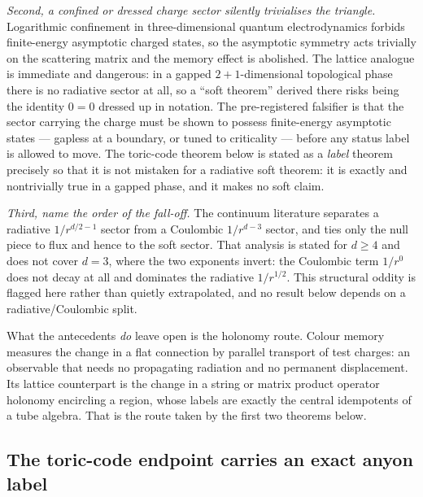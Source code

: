 \emph{Second, a confined or dressed charge sector silently trivialises the
triangle.} Logarithmic confinement in three-dimensional quantum
electrodynamics forbids finite-energy asymptotic charged states, so the
asymptotic symmetry acts trivially on the scattering matrix and the memory
effect is abolished. The lattice analogue is immediate and dangerous: in a
gapped $2+1$-dimensional topological phase there is no radiative sector at
all, so a ``soft theorem'' derived there risks being the identity $0=0$ dressed
up in notation. The pre-registered falsifier is that the sector carrying the
charge must be shown to possess finite-energy asymptotic states --- gapless at
a boundary, or tuned to criticality --- before any status label is allowed to
move. The toric-code theorem below is stated as a \emph{label} theorem
precisely so that it is not mistaken for a radiative soft theorem: it is
exactly and nontrivially true in a gapped phase, and it makes no soft claim.

\emph{Third, name the order of the fall-off.} The continuum literature
separates a radiative $1/r^{d/2-1}$ sector from a Coulombic $1/r^{d-3}$
sector, and ties only the null piece to flux and hence to the soft sector.
That analysis is stated for $d\ge4$ and does not cover $d=3$, where the two
exponents invert: the Coulombic term $1/r^{0}$ does not decay at all and
dominates the radiative $1/r^{1/2}$. This structural oddity is flagged here
rather than quietly extrapolated, and no result below depends on a
radiative/Coulombic split.

What the antecedents \emph{do} leave open is the holonomy route. Colour memory
measures the change in a flat connection by parallel transport of test
charges: an observable that needs no propagating radiation and no permanent
displacement. Its lattice counterpart is the change in a string or matrix
product operator holonomy encircling a region, whose labels are exactly the
central idempotents of a tube algebra. That is the route taken by the first two
theorems below.

\subsection{The toric-code endpoint carries an exact anyon label}


